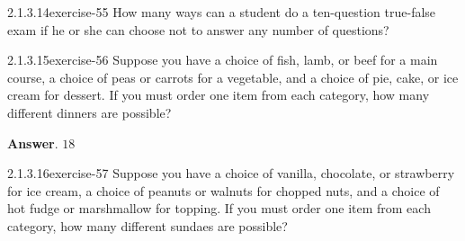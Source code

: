 \documentclass[twoside,10pt,]{book}
\numberwithin{equation}{section}
\begin{document}
\begin{divisionsolution}{2.1.3.14}{}{exercise-55}%
\hypertarget{p-614}{}%
How many ways can a student do a ten-question true-false exam if he or she can choose not to answer any number of questions?%
\end{divisionsolution}%
\begin{divisionsolution}{2.1.3.15}{}{exercise-56}%
\hypertarget{p-615}{}%
Suppose you have a choice of fish, lamb, or beef for a main course, a choice of peas or carrots for a vegetable, and a choice of pie, cake, or ice cream for dessert. If you must order one item from each category, how many different dinners are possible?%
\par\smallskip%
\noindent\textbf{Answer}.\quad%
\hypertarget{p-616}{}%
\(18\)%
\end{divisionsolution}%
\begin{divisionsolution}{2.1.3.16}{}{exercise-57}%
\hypertarget{p-617}{}%
Suppose you have a choice of vanilla, chocolate, or strawberry for ice cream, a choice of peanuts or walnuts for chopped nuts, and a choice of hot fudge or marshmallow for topping. If you must order one item from each category, how many different sundaes are possible?%
\end{divisionsolution}%
\end{document}

